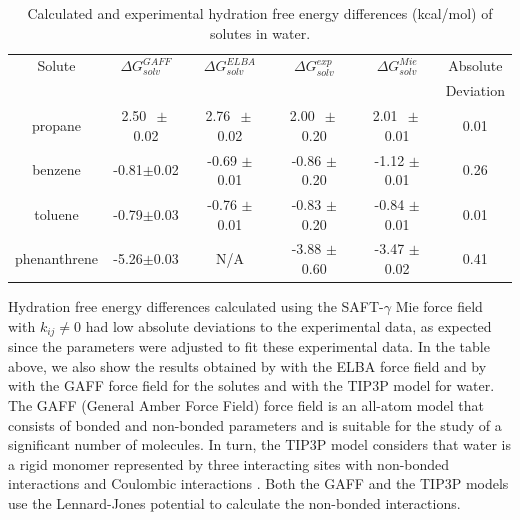 \begin{table}[H]
	\centering
	\caption{Calculated and experimental hydration free energy differences  (kcal/mol) of solutes in water.}
	\label{tbl:solv2}
	\begin{tabular}{cccccc}
		\hline\hline
		Solute       & $\Delta G_{solv}^{GAFF}$ & $\Delta G_{solv}^{ELBA}$ & $\Delta G_{solv}^{exp}$ & $\Delta G_{solv}^{Mie}$ & Absolute  \\
		&                          &                          &                         &                         & Deviation \\ \hline\hline
		propane      & 2.50 $\, \pm$0.02           & 2.76 $\, \pm$ 0.02          & 2.00 $\, \pm$ 0.20         & 2.01 $ \, \pm$ 0.01         & 0.01      \\
		benzene      & -0.81$\pm$0.02           & -0.69 $\pm$ 0.01         & -0.86 $\pm$ 0.20        & -1.12 $\pm$ 0.01        & 0.26      \\
		toluene      & -0.79$\pm$0.03           & -0.76 $\pm$ 0.01         & -0.83 $\pm$ 0.20        & -0.84 $\pm$ 0.01        & 0.01      \\
		phenanthrene & -5.26$\pm$0.03           & N/A                        & -3.88 $\pm$ 0.60        & -3.47 $\pm$ 0.02        & 0.41      \\ \hline\hline
	\end{tabular}
	
\end{table}

Hydration free energy differences calculated using the SAFT-$\gamma$ Mie force field with $k_{ij} \neq 0$ had low absolute deviations to the experimental data, as expected since the parameters were adjusted to fit these experimental data. In the table above, we also show the results obtained by  with the ELBA force field and by  with the GAFF force field for the solutes and with the TIP3P model for water. The GAFF (General Amber Force Field) force field is an all-atom model that consists of bonded and non-bonded parameters and is suitable for the study of a significant number of molecules. In turn, the TIP3P model considers that water is a rigid monomer represented by three interacting sites with non-bonded interactions and Coulombic interactions \cite{doi:10.1063/1.445869}. Both the GAFF and the TIP3P models use the Lennard-Jones potential to calculate the non-bonded interactions.

